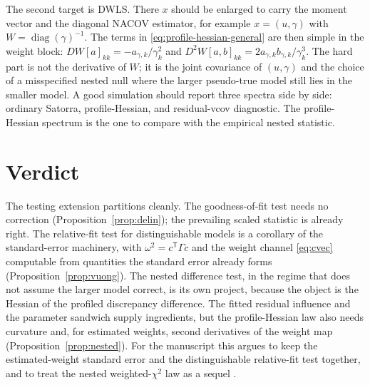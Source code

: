 \documentclass[11pt]{article}
\newcommand{\diag}{\operatorname{diag}}
\newcommand{\T}{^{\mathsf{T}}}
\theoremstyle{plain}
\theoremstyle{remark}
\begin{document}
The second target is DWLS. There $x$ should be enlarged to carry the moment
vector and the diagonal NACOV estimator, for example $x=(u,\gamma)$ with
$W=\diag(\gamma)^{-1}$. The terms in \eqref{eq:profile-hessian-general} are then
simple in the weight block:
$DW[a]_{kk}=-a_{\gamma,k}/\gamma_{k}^{2}$ and
$D^{2}W[a,b]_{kk}=2a_{\gamma,k}b_{\gamma,k}/\gamma_{k}^{3}$. The hard part is
not the derivative of $W$; it is the joint covariance of $(u,\gamma)$ and the
choice of a misspecified nested null where the larger pseudo-true model still
lies in the smaller model. A good simulation should report three spectra side by
side: ordinary Satorra, profile-Hessian, and residual-vcov diagnostic. The
profile-Hessian spectrum is the one to compare with the empirical nested
statistic.

\section{Verdict}
\label{sec:verdict}

The testing extension partitions cleanly. The goodness-of-fit test needs no
correction (Proposition~\ref{prop:delin}); the prevailing scaled statistic is
already right. The relative-fit test for distinguishable models is a corollary
of the standard-error machinery, with $\omega^{2}=c\T\Gamma c$ and the weight
channel \eqref{eq:cvec} computable from quantities the standard error already
forms (Proposition~\ref{prop:vuong}). The nested difference test, in the regime
that does not assume the larger model correct, is its own project, because the
object is the Hessian of the profiled discrepancy difference. The fitted
residual influence and the parameter sandwich supply ingredients, but the
profile-Hessian law also needs curvature and, for estimated weights, second
derivatives of the weight map (Proposition~\ref{prop:nested}). For the
manuscript this argues to keep the estimated-weight standard error and the
distinguishable relative-fit test together, and to treat the nested
weighted-$\chi^{2}$ law as a sequel
\cite{vuong1989,merkleyou2016}.
\end{document}
